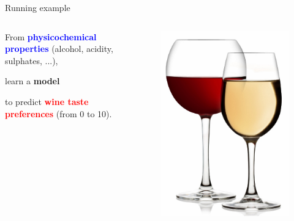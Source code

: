 \documentclass{beamer}
\newcommand{\X}[1]{\textcolor{blue}{#1}}
\newcommand{\y}[1]{\textcolor{red}{#1}}
\newcommand{\model}[1]{\textcolor{mygreen}{#1}}
\begin{document}
\begin{frame}{Running example}

\begin{columns}
\begin{column}{0.5\textwidth}

\begin{center}
From {\bf \X{physicochemical properties}} (alcohol, acidity, sulphates, ...),

\vspace{1cm}
learn a {\bf \model{model}}
\vspace{1cm}

to predict {\bf \y{wine taste preferences}} (from 0 to 10).

\end{center}

\end{column}
\begin{column}{0.5\textwidth}
  \begin{figure}
  \vspace{-0.5cm}
  \includegraphics[scale=0.6]{./figures/wine.jpg}
  \end{figure}
\end{column}
\end{columns}


\end{frame}
\end{document}
